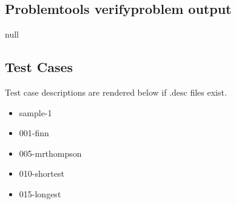 \documentclass{article}%
\begin{document}
%
\subsection{Problemtools verifyproblem output}%
\label{subsec:Problemtoolsverifyproblemoutput}%
null

%
\subsection{Test Cases}%
\label{subsec:TestCases}%
Test case descriptions are rendered below if .desc files exist.%
\begin{itemize}%
\item%
sample{-}1%
\item%
001{-}finn%
%
\item%
005{-}mrthompson%
%
\item%
010{-}shortest%
\item%
015{-}longest%
\end{itemize}

%
\end{document}
